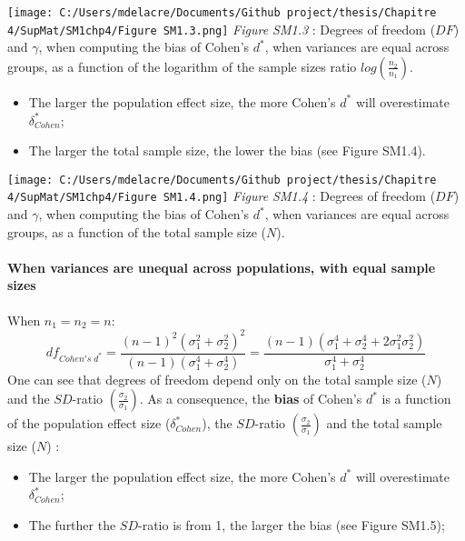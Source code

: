 \documentclass[
  english,
  man,mask,floatsintext]{apa6}
\providecommand{\tightlist}{%
  \setlength{\itemsep}{0pt}\setlength{\parskip}{0pt}}
\let\oldparagraph\paragraph
\renewcommand{\paragraph}[1]{\oldparagraph{#1}\mbox{}}
\begin{document}
\texttt{[image: C:/Users/mdelacre/Documents/Github project/thesis/Chapitre 4/SupMat/SM1chp4/Figure SM1.3.png]}
\emph{Figure SM1.3} : Degrees of freedom (\(DF\)) and \(\gamma\), when computing the bias of Cohen's \(d^*\), when variances are equal across groups, as a function of the logarithm of the sample sizes ratio \(log\left(\frac{n_2}{n_1} \right)\).

\begin{itemize}
\item
  The larger the population effect size, the more Cohen's \(d^*\) will overestimate \(\delta^*_{Cohen}\);
\item
  The larger the total sample size, the lower the bias (see Figure SM1.4).
\end{itemize}

\texttt{[image: C:/Users/mdelacre/Documents/Github project/thesis/Chapitre 4/SupMat/SM1chp4/Figure SM1.4.png]}
\emph{Figure SM1.4} : Degrees of freedom (\(DF\)) and \(\gamma\), when computing the bias of Cohen's \(d^*\), when variances are equal across groups, as a function of the total sample size (\(N\)).

\hypertarget{when-variances-are-unequal-across-populations-with-equal-sample-sizes}{%
\paragraph{When variances are unequal across populations, with equal sample sizes}\label{when-variances-are-unequal-across-populations-with-equal-sample-sizes}}

When \(n_1 = n_2 = n\):
\[df_{Cohen's \; d^*} = \frac{(n-1)^2(\sigma^2_1+\sigma^2_2)^2}{(n-1)(\sigma^4_1+\sigma^4_2)} =  \frac{(n-1)(\sigma^4_1+\sigma^4_2+2\sigma^2_1\sigma^2_2)}{\sigma^4_1+\sigma^4_2}\]
One can see that degrees of freedom depend only on the total sample size (\(N\)) and the \(SD\)-ratio \(\left( \frac{\sigma_2}{\sigma_1}\right)\). As a consequence, the \textbf{bias} of Cohen's \(d^*\) is a function of the population effect size (\(\delta^*_{Cohen}\)), the \(SD\)-ratio \(\left( \frac{\sigma_2}{\sigma_1}\right)\) and the total sample size (\(N\)) :
\newpage

\begin{itemize}
\tightlist
\item
  The larger the population effect size, the more Cohen's \(d^*\) will overestimate \(\delta^*_{Cohen}\);
\item
  The further the \(SD\)-ratio is from 1, the larger the bias (see Figure SM1.5);
\end{itemize}
\end{document}
